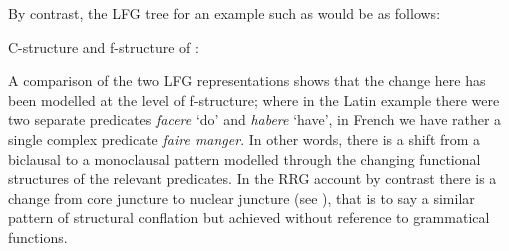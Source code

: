\documentclass[output=paper,hidelinks]{langscibook}
\begin{document}
\largerpage[2]
By contrast, the LFG tree for an example such as  would be as follows:


\ea
\label{fig:RRG:15} C-structure and f-structure of : 
\z

A comparison of the two LFG representations shows that the change here has been modelled at the level of f-structure; where in the Latin example there were two separate predicates \textit{facere} `do' and \textit{habere} `have', in French we have rather a single complex predicate \textit{faire manger}. In other words, there is a shift from a biclausal to a monoclausal pattern modelled through the changing functional structures of the relevant predicates. In the RRG account by contrast there is a change from core juncture to  nuclear juncture (see ), that is to say a similar pattern of structural conflation but achieved without reference to grammatical functions.
\end{document}
